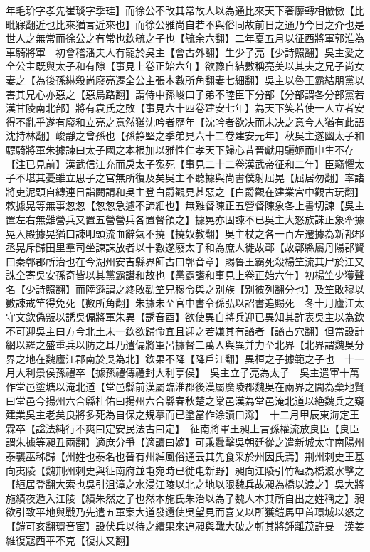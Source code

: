 年毛玠字孝先崔琰字季珪】而徐公不改其常故人以為通比來天下奢靡轉相倣傚【比毗寐翻近也比來猶言近來也】而徐公雅尚自若不與俗同故前日之通乃今日之介也是世人之無常而徐公之有常也欽毓之子也【毓余六翻】二年夏五月以征西將軍郭淮為車騎將軍　初會稽潘夫人有寵於吳主【會古外翻】生少子亮【少詩照翻】吳主愛之全公主既與太子和有隙【事見上卷正始六年】欲豫自結數稱亮美以其夫之兄子尚女妻之【為後孫綝殺尚廢亮遷全公主張本數所角翻妻七細翻】吳主以魯王霸結朋黨以害其兄心亦惡之【惡烏路翻】謂侍中孫峻曰子弟不睦臣下分部【分部謂各分部黨若漢甘陵南北部】將有袁氏之敗【事見六十四卷建安七年】為天下笑若使一人立者安得不亂乎遂有廢和立亮之意然猶沈吟者歷年【沈吟者欲决而未决之意今人猶有此語沈持林翻】峻靜之曾孫也【孫静堅之季弟見六十二卷建安元年】秋吳主遂幽太子和驃騎將軍朱據諫曰太子國之本根加以雅性仁孝天下歸心昔晉獻用驪姬而申生不存【注已見前】漢武信江充而戾太子寃死【事見二十二卷漢武帝征和二年】臣竊懼太子不堪其憂雖立思子之宫無所復及矣吳主不聽據與尚書僕射屈晃【屈居勿翻】率諸將吏泥頭自縳連日詣闕請和吳主登白爵觀見甚惡之【白爵觀在建業宫中觀古玩翻】敕據晃等無事怱怱【怱怱急遽不諦細也】無難督陳正五營督陳象各上書切諫【吳主置左右無難營兵又置五營營兵各置督領之】據晃亦固諫不已吳主大怒族誅正象牽據晃入殿據晃猶口諫叩頭流血辭氣不撓【撓奴教翻】吳主杖之各一百左遷據為新都郡丞晃斥歸田里羣司坐諫誅放者以十數遂廢太子和為庶人徙故鄣【故鄣縣屬丹陽郡賢曰秦鄣郡所治也在今湖州安吉縣界師古曰鄣音章】賜魯王霸死殺楊笁流其尸於江又誅全寄吳安孫奇皆以其黨霸譖和故也【黨霸譖和事見上卷正始六年】初楊笁少獲聲名【少詩照翻】而陸遜謂之終敗勸笁兄穆令與之别族【别彼列翻分也】及笁敗穆以數諫戒笁得免死【數所角翻】朱據未至官中書令孫弘以詔書追賜死　冬十月廬江太守文欽偽叛以誘吳偏將軍朱異【誘音酉】欲使異自將兵迎已異知其詐表吳主以為欽不可迎吳主曰方今北土未一欽欲歸命宜且迎之若嫌其有譎者【譎古穴翻】但當設計網以羅之盛重兵以防之耳乃遣偏將軍呂據督二萬人與異并力至北界【北界謂魏吳分界之地在魏廬江郡南於吳為北】欽果不降【降戶江翻】異桓之子據範之子也　十一月大利景侯孫禮卒【據孫禮傳禮封大利亭侯】　吳主立子亮為太子　吳主遣軍十萬作堂邑塗塘以淹北道【堂邑縣前漢屬臨淮郡後漢屬廣陵郡魏吳在兩界之間為棄地賢曰堂邑今揚州六合縣杜佑曰揚州六合縣春秋楚之棠邑漢為堂邑淹北道以絶魏兵之窺建業吳主老矣良將多死為自保之規摹而已塗當作涂讀曰滁】　十二月甲辰東海定王霖卒【諡法純行不爽曰定安民法古曰定】　征南將軍王昶上言孫權流放良臣【良臣謂朱據等昶丑兩翻】適庶分爭【適讀曰嫡】可乘釁擊吳朝廷從之遣新城太守南陽州泰襲巫秭歸【州姓也泰名也晉有州綽風俗通云其先食采於州因氏焉】荆州刺史王基向夷陵【魏荆州刺史與征南府並屯宛時已徙屯新野】昶向江陵引竹絙為橋渡水擊之【絙居登翻大索也吳引沮漳之水浸江陵以北之地以限魏兵故昶為橋以渡之】吳大將施績夜遁入江陵【績朱然之子也然本施氏朱治以為子魏人本其所自出之姓稱之】昶欲引致平地與戰乃先遣五軍案大道發還使吳望見而喜又以所獲鎧馬甲首環城以怒之【鎧可亥翻環音宦】設伏兵以待之績果來追昶與戰大破之斬其將鍾離茂許旻　漢姜維復寇西平不克【復扶又翻】

